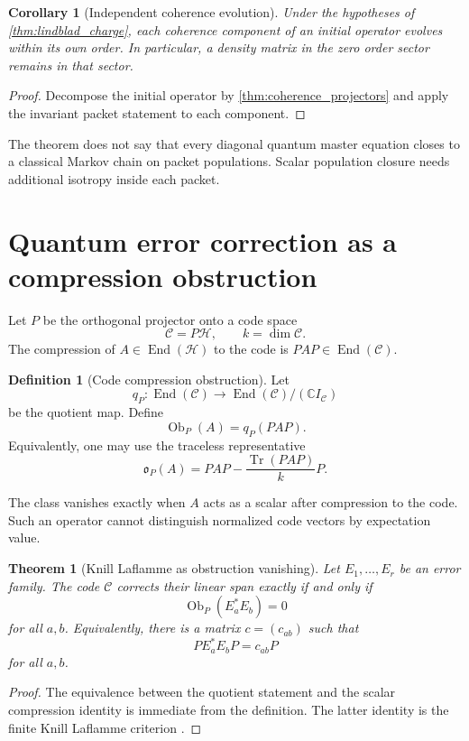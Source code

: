 \documentclass{aomart}
\newtheorem{theorem}{Theorem}[section]
\newtheorem{corollary}[corollary]{Corollary}
\theoremstyle{definition}
\newtheorem{definition}[definition]{Definition}
\theoremstyle{remark}
\newcommand{\CC}{\mathbb C}
\newcommand{\Hcal}{\mathcal H}
\newcommand{\Ccal}{\mathcal C}
\newcommand{\End}{\operatorname{End}}
\newcommand{\Tr}{\operatorname{Tr}}
\newcommand{\Ob}{\operatorname{Ob}}
\newcommand{\ob}{\mathfrak o}
\begin{document}
\begin{corollary}[Independent coherence evolution]\label{cor:no_coherence_mixing}
Under the hypotheses of \cref{thm:lindblad_charge}, each coherence component of an initial operator evolves within its own order. In particular, a density matrix in the zero order sector remains in that sector.
\end{corollary}

\begin{proof}
Decompose the initial operator by \cref{thm:coherence_projectors} and apply the invariant packet statement to each component.
\end{proof}

The theorem does not say that every diagonal quantum master equation closes to a classical Markov chain on packet populations. Scalar population closure needs additional isotropy inside each packet.

\section{Quantum error correction as a compression obstruction}\label{sec:qec}

Let \(P\) be the orthogonal projector onto a code space
\[
\Ccal=P\Hcal,
\qquad
k=\dim\Ccal.
\]
The compression of \(A\in\End(\Hcal)\) to the code is \(PAP\in\End(\Ccal)\).

\begin{definition}[Code compression obstruction]\label{def:code_obstruction}
Let
\[
q_P:\End(\Ccal)\longrightarrow\End(\Ccal)/(\CC I_{\Ccal})
\]
be the quotient map. Define
\[
\Ob_P(A)=q_P(PAP).
\]
Equivalently, one may use the traceless representative
\[
\ob_P(A)
=
PAP-
\frac{\Tr(PAP)}{k}P.
\]
\end{definition}

The class vanishes exactly when \(A\) acts as a scalar after compression to the code. Such an operator cannot distinguish normalized code vectors by expectation value.

\begin{theorem}[Knill Laflamme as obstruction vanishing]\label{thm:kl_obstruction}
Let \(E_1,\ldots,E_r\) be an error family. The code \(\Ccal\) corrects their linear span exactly if and only if
\[
\Ob_P(E_a^*E_b)=0
\]
for all \(a,b\). Equivalently, there is a matrix \(c=(c_{ab})\) such that
\[
PE_a^*E_bP=c_{ab}P
\]
for all \(a,b\).
\end{theorem}

\begin{proof}
The equivalence between the quotient statement and the scalar compression identity is immediate from the definition. The latter identity is the finite Knill Laflamme criterion \cite{KnillLaflamme1997,SchumacherNielsen1996}.
\end{proof}
\end{document}

